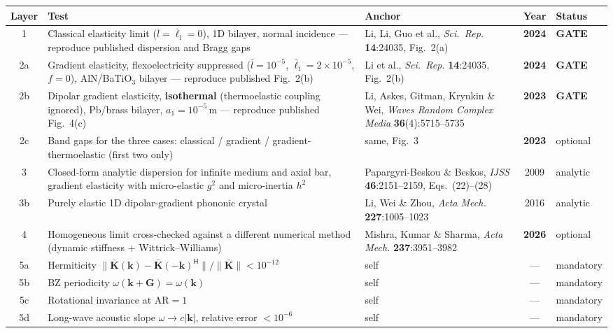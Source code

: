 \documentclass[11pt,a4paper]{article}
\begin{document}
\begin{xltabular}{\textwidth}{@{}c L{5.0cm} L{2.6cm} c Y@{}}
\toprule
Layer & Test & Anchor & Year & Status \\
 & Classical elasticity limit ($\bar l=\bar\ell_{\mathrm i}=0$), 1D bilayer, normal incidence --- reproduce published dispersion and Bragg gaps & Li, Li, Guo et al., \emph{Sci.\ Rep.} \textbf{14}:24035, Fig.~2(a) & \textbf{2024} & \textcolor{warn}{\textbf{GATE}} \\
2a & Gradient elasticity, flexoelectricity suppressed ($\bar l=10^{-5}$, $\bar\ell_{\mathrm i}=2\times10^{-5}$, $f=0$), AlN/BaTiO$_3$ bilayer --- reproduce published Fig.~2(b) & Li et al., \emph{Sci.\ Rep.} \textbf{14}:24035, Fig.~2(b) & \textbf{2024} & \textcolor{warn}{\textbf{GATE}} \\
2b & Dipolar gradient elasticity, \textbf{isothermal} (thermoelastic coupling ignored), Pb/brass bilayer, $a_1=10^{-5}$\,m --- reproduce published Fig.~4(c) & Li, Askes, Gitman, Krynkin \& Wei, \emph{Waves Random Complex Media} \textbf{36}(4):5715--5735 & \textbf{2023} & \textcolor{warn}{\textbf{GATE}} \\
2c & Band gaps for the three cases: classical / gradient / gradient-thermoelastic (first two only) & same, Fig.~3 & \textbf{2023} & optional \\
3 & Closed-form analytic dispersion for infinite medium and axial bar, gradient elasticity with micro-elastic $g^2$ and micro-inertia $h^2$ & Papargyri-Beskou \& Beskos, \emph{IJSS} \textbf{46}:2151--2159, Eqs.\ (22)--(28) & 2009 & analytic \\
3b & Purely elastic 1D dipolar-gradient phononic crystal & Li, Wei \& Zhou, \emph{Acta Mech.} \textbf{227}:1005--1023 & 2016 & analytic \\
4 & Homogeneous limit cross-checked against a different numerical method (dynamic stiffness + Wittrick--Williams) & Mishra, Kumar \& Sharma, \emph{Acta Mech.} \textbf{237}:3951--3982 & \textbf{2026} & optional \\
5a & Hermiticity $\|\bar{\bm K}(\bm k)-\bar{\bm K}(-\bm k)^{\mathsf H}\|/\|\bar{\bm K}\|<10^{-12}$ & self & --- & mandatory \\
5b & BZ periodicity $\omega(\bm k+\bm G)=\omega(\bm k)$ & self & --- & mandatory \\
5c & Rotational invariance at $\mathrm{AR}=1$ & self & --- & mandatory \\
5d & Long-wave acoustic slope $\omega\to c|\bm k|$, relative error $<10^{-6}$ & self & --- & mandatory \\

\end{xltabular}
\end{document}
